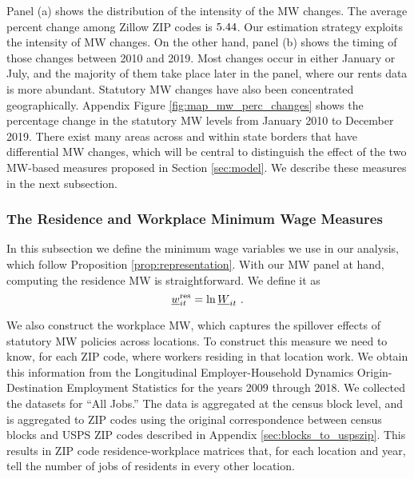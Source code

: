Panel (a) shows the distribution of the intensity of the MW changes. 
The average percent change among Zillow ZIP codes is $\textnormal{5.44}$.
Our estimation strategy exploits the intensity of MW changes.
On the other hand, panel (b) shows the timing of those changes between 2010 and 
2019.
Most changes occur in either January or July, and the majority of them take 
place later in the panel, where our rents data is more abundant.
Statutory MW changes have also been concentrated geographically.
Appendix Figure \ref{fig:map_mw_perc_changes} shows the percentage change 
in the statutory MW levels from January 2010 to December 2019.
There exist many areas across and within state borders that have differential 
MW changes,
which will be central to distinguish the effect of the two MW-based measures
proposed in Section \ref{sec:model}.
We describe these measures in the next subsection. 

\subsubsection{The Residence and Workplace Minimum Wage Measures}

In this subsection we define the minimum wage variables we use in our analysis,
which follow Proposition \ref{prop:representation}.
With our MW panel at hand, computing the residence MW is straightforward.
We define it as
\begin{equation*}
    \underline{w}^{\text{res}}_{it} = \ln \underline{W}_{it} \ .
\end{equation*}

We also construct the workplace MW, which captures the spillover effects of
statutory MW policies across locations.
To construct this measure we need to know, for each ZIP code, where workers 
residing in that location work.
We obtain this information from the Longitudinal Employer-Household 
Dynamics Origin-Destination Employment Statistics \parencite[LODES;][]{CensusLODES}
for the years 2009 through 2018.
We collected the datasets for ``All Jobs.''
The data is aggregated at the census block level, and is aggregated to ZIP codes 
using the original correspondence between census blocks and USPS ZIP codes 
described in Appendix \ref{sec:blocks_to_uspszip}.
This results in ZIP code residence-workplace matrices that, for each location 
and year, tell the number of jobs of residents in every other location.

